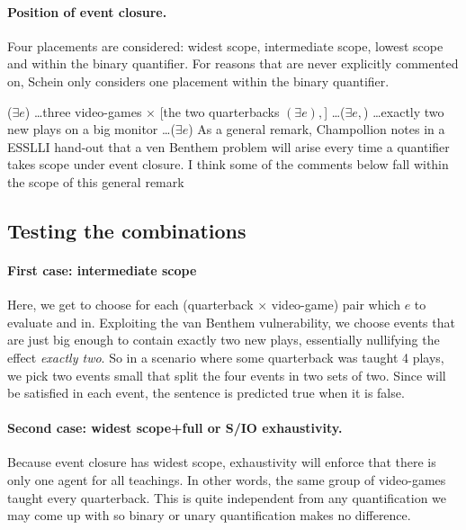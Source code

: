 \documentclass[english]{article}
\newcommand{\scale}1
\begin{document}
\paragraph{Position of event closure.} Four placements are considered: widest scope, intermediate scope, lowest scope and within the binary quantifier. For reasons that are never explicitly commented on, Schein only considers one placement within the binary quantifier.

\ex
($\exists e$) \ldots three video-games $\times$ [the two quarterbacks $(\exists e),$] \ldots ($\exists e,$) \ldots exactly two new plays on a big monitor \ldots ($\exists e$)
\xe
%
As a general remark, Champollion notes in a ESSLLI hand-out that a ven Benthem problem will arise every time a quantifier takes scope under event closure. I think some of the comments below fall within the scope of this general remark

\subsection{Testing the combinations}
\paragraph{First case: intermediate scope} Here, we get to choose for each (quarterback $\times$ video-game) pair which $e$ to evaluate  and  in. Exploiting the van Benthem vulnerability, we choose events that are just big enough to contain exactly two new plays, essentially nullifying the effect \emph{exactly two}. So in a scenario where some quarterback was taught 4 plays, we pick two events small that split the four events in two sets of two. Since  will be satisfied in each event, the sentence is predicted true when it is false.


\ex \label{cutoff}
\renewcommand{\scale}{0.75}

\xe
%


\paragraph{Second case: widest scope+full or S/IO exhaustivity.} Because event closure has widest scope, exhaustivity will enforce that there is only one agent for all teachings. In other words, the same group of video-games taught every quarterback. This is quite independent from any quantification we may come up with so binary or unary quantification makes no difference.
\end{document}
